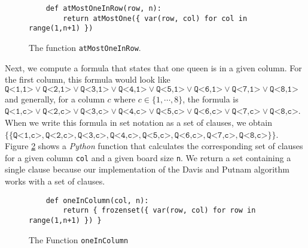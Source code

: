 \begin{figure}[!ht]
  \centering
\begin{verbatim}
    def atMostOneInRow(row, n):
        return atMostOne({ var(row, col) for col in range(1,n+1) })
\end{verbatim}
\vspace*{-0.3cm}
  \caption{The function \texttt{atMostOneInRow}.}
  \label{fig:atMostOneInRow}
\end{figure}
Next, we compute a formula that states that  one queen is in a given
column. For the first column, this formula would look like
\\[0.2cm]
\hspace*{1.3cm}
$\texttt{Q<1,1>} \vee \texttt{Q<2,1>} \vee \texttt{Q<3,1>} \vee \texttt{Q<4,1>} \vee \texttt{Q<5,1>} \vee
\texttt{Q<6,1>} \vee \texttt{Q<7,1>} \vee \texttt{Q<8,1>}$
\\[0.2cm]
and generally, for a column $c$ where $c \in \{1,\cdots,8\}$, the formula is
\\[0.2cm]
\hspace*{1.3cm}
$\texttt{Q<1,c>} \vee \texttt{Q<2,c>} \vee \texttt{Q<3,c>} \vee \texttt{Q<4,c>} \vee \texttt{Q<5,c>} \vee
\texttt{Q<6,c>} \vee \texttt{Q<7,c>} \vee \texttt{Q<8,c>}$.
\\[0.2cm]
When we write this formula in set notation as a set of clauses, we obtain
\\[0.2cm]
\hspace*{1.3cm}
$\bigl\{ \{\texttt{Q<1,c>} , \texttt{Q<2,c>} , \texttt{Q<3,c>} , \texttt{Q<4,c>} , \texttt{Q<5,c>} ,
\texttt{Q<6,c>} , \texttt{Q<7,c>} , \texttt{Q<8,c>} \}\bigr\}$.
\\[0.2cm]
Figure \ref{fig:oneInColumn} shows a \textsl{Python} function that calculates the corresponding set of clauses for a given column
\texttt{col} and a given board size \texttt{n}.
We return a set containing  a single clause because our implementation of the Davis and Putnam algorithm
works with a set of clauses.

\begin{figure}[!ht]
  \centering
\begin{verbatim}
    def oneInColumn(col, n):
        return { frozenset({ var(row, col) for row in range(1,n+1) }) }
\end{verbatim}
\vspace*{-0.3cm}
  \caption{The Function \texttt{oneInColumn}}
  \label{fig:oneInColumn}
\end{figure}

